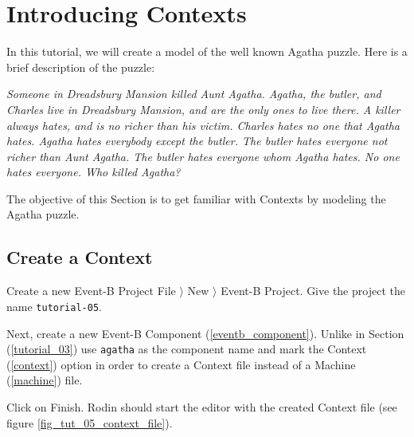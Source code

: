 \section{Introducing Contexts}
\label{tutorial_05}


In this tutorial, we will create a model of the well known Agatha puzzle. Here is a brief description of the puzzle:

\textit{Someone in Dreadsbury Mansion killed Aunt Agatha. Agatha, the butler, and Charles live in Dreadsbury Mansion, and are the only ones to live there. A killer always hates, and is no richer than his victim. Charles hates no one that Agatha hates. Agatha hates everybody except the butler. The butler hates everyone not richer than Aunt Agatha. The butler hates everyone whom Agatha hates. No one hates everyone. Who killed Agatha?}

The objective of this Section is to get familiar with Contexts by modeling the Agatha puzzle.

\subsection{Create a Context}

Create a new Event-B Project \textsf{File $\rangle$ New $\rangle$ Event-B Project}. Give the project the name \texttt{tutorial-05}. 

Next, create a new Event-B Component (\ref{eventb_component}). Unlike in Section (\ref{tutorial_03}) use \texttt{agatha} as the component name and mark the \textsf{Context} (\ref{context}) option in order to create a Context file instead of a Machine (\ref{machine}) file.


Click on \textsf{Finish}. Rodin should start the editor with the created Context file (see figure \ref{fig_tut_05_context_file}).


